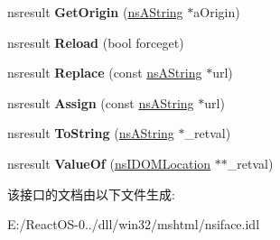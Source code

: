 \begin{DoxyCompactItemize}
\mbox{\label{interfacens_i_d_o_m_location_a6348eedcc5096311bbf1de8f6923b46c}} 
nsresult {\bfseries Get\+Origin} (\hyperlink{structns_string_container}{ns\+A\+String} $\ast$a\+Origin)
\item 
\mbox{\label{interfacens_i_d_o_m_location_a838148eac0756ce85a718d93b236bc2a}} 
nsresult {\bfseries Reload} (bool forceget)
\item 
\mbox{\label{interfacens_i_d_o_m_location_a6a4381f1772fb798025f76072d11d6d8}} 
nsresult {\bfseries Replace} (const \hyperlink{structns_string_container}{ns\+A\+String} $\ast$url)
\item 
\mbox{\label{interfacens_i_d_o_m_location_ac45088bfe354a11998ca4d2187d52695}} 
nsresult {\bfseries Assign} (const \hyperlink{structns_string_container}{ns\+A\+String} $\ast$url)
\item 
\mbox{\label{interfacens_i_d_o_m_location_a80139d960abb8d5d3135858ad5d0bf05}} 
nsresult {\bfseries To\+String} (\hyperlink{structns_string_container}{ns\+A\+String} $\ast$\+\_\+retval)
\item 
\mbox{\label{interfacens_i_d_o_m_location_a65ca9e986dbf1d5ca44bf65d80adf49b}} 
nsresult {\bfseries Value\+Of} (\hyperlink{interfacens_i_d_o_m_location}{ns\+I\+D\+O\+M\+Location} $\ast$$\ast$\+\_\+retval)
\end{DoxyCompactItemize}


该接口的文档由以下文件生成\+:\begin{DoxyCompactItemize}
\item 
E\+:/\+React\+O\+S-\/0../dll/win32/mshtml/nsiface.\+idl\end{DoxyCompactItemize}
